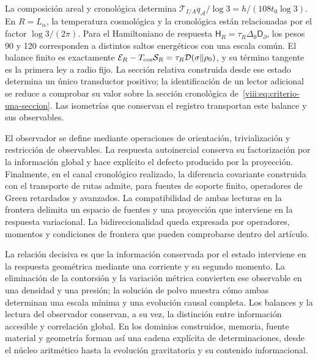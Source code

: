 La composición areal y cronológica determina
\(\mathcal T_{I/A}q_{\mathcal A}/\log3=h/(108t_0\log3)\).
En \(R=L_\alpha\), la temperatura cosmológica y la cronológica
están relacionadas por el factor \(\log3/(2\pi)\).
Para el Hamiltoniano de respuesta
\(\mathsf H_R=\tau_R\Delta_0\mathsf D_\partial\), los pesos
90 y 120 corresponden a distintos saltos energéticos con una escala
común. El balance finito es exactamente
\(\mathcal E_R-T_{\rm cos}\mathcal S_R
=\tau_R\mathcal D(\sigma\Vert\rho_0)\), y su término tangente
es la primera ley a radio fijo. La sección relativa construida desde
ese estado determina un único transductor positivo; la identificación
de un lector adicional se reduce a comprobar su valor sobre la sección
cronológica de~\eqref{viii:eq:criterio-una-seccion}. Las isometrías que
conservan el registro transportan este balance y sus observables.

El observador se define mediante operaciones de orientación,
trivialización y restricción de observables. La respuesta
autoinercial conserva su factorización por la información global
y hace explícito el defecto producido por la proyección.
Finalmente, en el canal cronológico realizado, la diferencia covariante
construida con el transporte de rutas admite, para fuentes de soporte
finito, operadores de Green retardados y avanzados. La compatibilidad de ambas lecturas
en la frontera delimita un espacio de fuentes y una proyección
que interviene en la respuesta variacional. La bidireccionalidad
queda expresada por operadores, momentos y condiciones de frontera
que pueden comprobarse dentro del artículo.

\enlargethispage{2\baselineskip}
La relación decisiva es que la información conservada por el estado
interviene en la respuesta geométrica mediante una corriente y su segundo
momento. La eliminación de la contorsión y la variación métrica convierten
ese observable en una densidad y una presión; la solución de polvo muestra
cómo ambas determinan una escala mínima y una evolución causal completa.
Los balances y la lectura del observador conservan, a su vez, la
distinción entre información accesible y correlación global. En los
dominios construidos, memoria, fuente material y geometría forman así una
cadena explícita de determinaciones, desde el núcleo aritmético hasta la
evolución gravitatoria y su contenido informacional.
